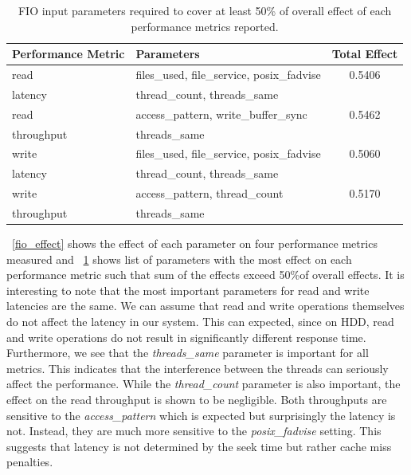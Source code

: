 \begin{table}
\caption{FIO input parameters required to cover at least 50\% of overall effect of each performance metrics reported.}
\label{fio_50_t}
\centering
\begin{tabularx}{\textwidth}{
  l | 
  X 
  c
}
\hline
\bfseries Performance Metric &\bfseries Parameters &\bfseries Total Effect\\
\hline\hline
read        & files\_used, file\_service, posix\_fadvise  &0.5406   \\
latency     & thread\_count, threads\_same                &         \\
\hline
read        & access\_pattern, write\_buffer\_sync        &0.5462   \\
throughput  & threads\_same                               &         \\
\hline
write       & files\_used, file\_service, posix\_fadvise  &0.5060   \\
latency     & thread\_count, threads\_same                &         \\
\hline
write       & access\_pattern, thread\_count              &0.5170   \\
throughput  & threads\_same                               &         \\
\hline
\end{tabularx}
\end{table}

\figurename~\ref{fio_effect} shows the effect of each parameter on four performance metrics measured and \tablename~\ref{fio_50_t} shows list of parameters with the most effect on each performance metric such that sum of the effects exceed 50\%of overall effects. It is interesting to note that the most important parameters for read and write latencies are the same. We can assume that read and write operations themselves do not affect the latency in our system. This can expected, since on HDD, read and write operations do not result in significantly different response time.  Furthermore, we see that the \emph{threads\_same} parameter is important for all metrics. This indicates that the interference between the threads can seriously affect the performance. While the \emph{thread\_count} parameter is also important, the effect on the read throughput is shown to be negligible. Both throughputs are sensitive to the \emph{access\_pattern} which is expected but surprisingly the latency is not. Instead, they are much more sensitive to the \emph{posix\_fadvise} setting. This suggests that latency is not determined by the seek time but rather cache miss penalties. 

